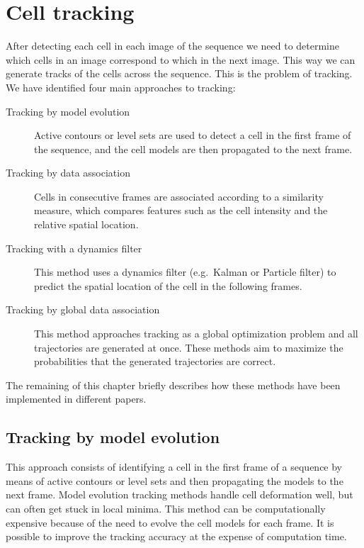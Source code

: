 \section{Cell tracking \statusfirstdraft}
\label{sec:tracking}

After detecting each cell in each image of the sequence we need to determine which cells in an image correspond to which in the next image. This way we can generate tracks of the cells across the sequence. This is the problem of tracking. We have identified four main approaches to tracking:

\begin{description}
	\item [Tracking by model evolution] Active contours or level sets are used to detect a cell in the first frame of the sequence, and the cell models are then propagated to the next frame.
	\item [Tracking by data association] Cells in consecutive frames are associated according to a similarity measure, which compares features such as the cell intensity and the relative spatial location.
	\item [Tracking with a dynamics filter] This method uses a dynamics filter (e.g.\ Kalman or Particle filter) to predict the spatial location of the cell in the following frames.
	\item [Tracking by global data association] This method approaches tracking as a global optimization problem and all trajectories are generated at once. These methods aim to maximize the probabilities that the generated trajectories are correct.
\end{description}

The remaining of this chapter briefly describes how these methods have been implemented in different papers.

\subsection{Tracking by model evolution \statusfirstdraft}

This approach consists of identifying a cell in the first frame of a sequence by means of active contours or level sets and then propagating the models to the next frame. Model evolution tracking methods handle cell deformation well, but can often get stuck in local minima. This method can be computationally expensive because of the need to evolve the cell models for each frame. It is possible to improve the tracking accuracy at the expense of computation time.


